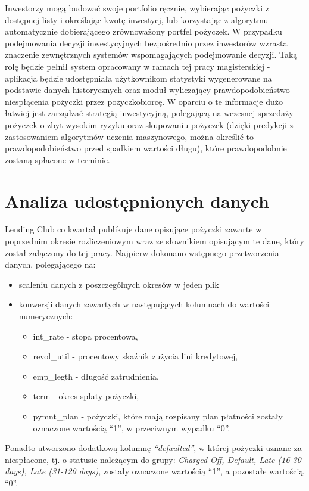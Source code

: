 Inwestorzy mogą budować swoje portfolio ręcznie, wybierając pożyczki z dostępnej listy i określając kwotę inwestycj, lub korzystając z algorytmu automatycznie dobierającego zrównoważony portfel pożyczek. W przypadku podejmowania decyzji inwestycyjnych bezpośrednio przez inwestorów wzrasta znaczenie zewnętrznych systemów wspomagających podejmowanie decyzji. Taką rolę będzie pełnił system opracowany w ramach tej pracy magisterskiej - aplikacja będzie udostępniała użytkownikom statystyki wygenerowane na podstawie danych historycznych oraz moduł wyliczający prawdopodobieństwo niespłącenia pożyczki przez pożyczkobiorcę. W oparciu o te informacje dużo łatwiej jest zarządzać strategią inwestycyjną, polegającą na wczesnej sprzedaży pożyczek o zbyt wysokim ryzyku oraz skupowaniu pożyczek (dzięki predykcji z zastosowaniem algorytmów uczenia maszynowego, można określić to prawdopodobieństwo przed spadkiem wartości długu), które prawdopodobnie zostaną spłacone w terminie.

\section{Analiza udostępnionych danych}

Lending Club co kwartał publikuje dane opisujące pożyczki zawarte w poprzednim okresie rozliczeniowym wraz ze słownikiem opisującym te dane, który został załączony do tej pracy. Najpierw dokonano wstępnego przetworzenia danych, polegającego na:

\begin{itemize}
\item scaleniu danych z poszczególnych okresów w jeden plik
\item konwersji danych zawartych w następujących kolumnach do wartości numerycznych:
	\begin{itemize}
		\item int\_rate - stopa procentowa,
		\item revol\_util - procentowy skaźnik zużycia lini kredytowej,
		\item emp\_legth - długość zatrudnienia,
		\item term - okres spłaty pożyczki,
		\item pymnt\_plan - pożyczki, które mają rozpisany plan płatności zostały oznaczone wartością ``1'', w przeciwnym wypadku ``0''.
	\end{itemize}
\end{itemize}

Ponadto utworzono dodatkową kolumnę \textit{``defaulted''}, w której pożyczki uznane za niespłacone, tj. o statusie należącym do grupy: \textit{Charged Off, Default, Late (16-30 days), Late (31-120 days)}, zostały oznaczone wartością ``1'', a pozostałe wartością ``0''.

